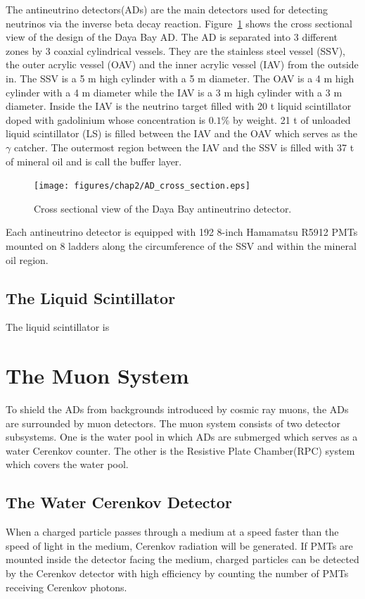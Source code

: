 The antineutrino detectors(ADs) are the main detectors used for detecting neutrinos via the inverse beta decay reaction. Figure~\ref{fig:CSAD} shows the cross sectional view of the design of the Daya Bay AD. The AD is separated into 3 different zones by 3 coaxial cylindrical vessels. They are the stainless steel vessel (SSV), the outer acrylic vessel (OAV) and the inner acrylic vessel (IAV) from the outside in. The SSV is a 5 m high cylinder with a 5 m diameter. The OAV is a 4 m high cylinder with a 4 m diameter while the IAV is a 3 m high cylinder with a 3 m diameter. Inside the IAV is the neutrino target filled with 20 t liquid scintillator doped with gadolinium whose concentration is $0.1\%$ by weight. 21 t of unloaded liquid scintillator (LS) is filled between the IAV and the OAV which serves as the $\gamma$ catcher. The outermost region between the IAV and the SSV is filled with 37 t of mineral oil and is call the buffer layer.
\begin{figure}
	\centering
	\texttt{[image: figures/chap2/AD\_cross\_section.eps]}
	\caption{Cross sectional view of the Daya Bay antineutrino detector.}
	\label{fig:CSAD}
\end{figure}
Each antineutrino detector is equipped with 192 8-inch Hamamatsu R5912 PMTs mounted on 8 ladders along the circumference of the SSV and within the mineral oil region.

\subsection{The Liquid Scintillator}
The liquid scintillator is 


\section{The Muon System}

To shield the ADs from backgrounds introduced by cosmic ray muons, the ADs are surrounded by muon detectors. The muon system consists of two detector subsystems. One is the water pool in which ADs are submerged which serves as a water Cerenkov counter. The other is the Resistive Plate Chamber(RPC) system which covers the water pool.

\subsection{The Water Cerenkov Detector}

When a charged particle passes through a medium at a speed faster than the speed of light in the medium, Cerenkov radiation will be generated. If PMTs are mounted inside the detector facing the medium, charged particles can be detected by the Cerenkov detector with high efficiency by counting the number of PMTs receiving Cerenkov photons.



